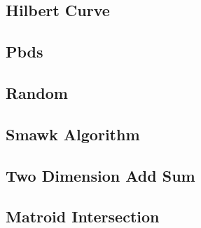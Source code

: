 \subsection{Hilbert Curve}

\subsection{Pbds}

\subsection{Random}

\subsection{Smawk Algorithm}

\subsection{Two Dimension Add Sum}

\subsection{Matroid Intersection}
